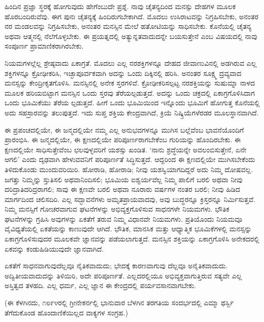 ಹಿಂದಿನ ಪ್ರಜ್ಞಾ ಸ್ಥರಕ್ಕೆ ಹೋಗುವುದು ಹೇಗೆಂಬುದೇ ಪ್ರಶ್ನೆ. ನಾವು ಚೈತನ್ಯದಿಂದ ಮನಸ್ಸು ದೇಹಗಳ ಮೂಲಕ ಹೊರಬಂದಿರುವೆವು. ಈಗ ಪುನಃ ಚೈತನ್ಯಕ್ಕೆ ಹಿಂದಿರುಗಬೇಕಾಗಿದೆ. ಮೊದಲು ಉಸಿರಾಟವನ್ನು ನಿಗ್ರಹಿಸಬೇಕು, ಅನಂತರ ನರ ಮಂಡಲವನ್ನು ನಿಗ್ರಹಿಸಬೇಕು, ಅನಂತರ ಮನಸ್ಸಿನ ಮೇಲೆ ಹತೋಟಿಯನ್ನು ಸಾಧಿಸಬೇಕು. ಕೊನೆಯಲ್ಲಿ ಚೈತನ್ಯ ಅಥವಾ ಆತ್ಮನಲ್ಲಿ ನೆಲೆಗೊಳ್ಳಬೇಕು. ಈ ಪ್ರಯತ್ನದಲ್ಲಿ ಅತ್ಯುನ್ನತವಾದುದನ್ನೇ ಬಯಸುತ್ತೇನೆ ಎಂಬ ವಿಷಯದಲ್ಲಿ ನಾವು ಸಂಪೂರ್ಣ ಪ್ರಾಮಾಣಿಕರಾಗಿರಬೇಕು.

ನಿಯಮಗಳಲ್ಲೆಲ್ಲ ಶ್ರೇಷ್ಠವಾದು ಏಕಾಗ್ರತೆ. ಮೊದಲು ಎಲ್ಲ ನರಶಕ್ತಿಗಳನ್ನೂ ದೇಹದ ಜೀವಾಣುವಿನಲ್ಲಿ ಅಡಗಿರುವ ಎಲ್ಲ ಶಕ್ತಿಗಳನ್ನೂ ಕ್ರೋಢೀಕರಿಸಿ, ಇಚ್ಛಾಪೂರ್ವಕವಾಗಿ ಅದನ್ನು ಒಂದು ದಿಕ್ಕಿನಲ್ಲಿ ಹರಿಸಿ. ಅನಂತರ ಸೂಕ್ಷ್ಮ ದ್ರವ್ಯವಾದ ಮನಸ್ಸನ್ನು ಕೇಂದ್ರೀಕೃತಗೊಳಿಸಿ. ಮನಸ್ಸಿನಲ್ಲಿ ಅನೇಕ ಸ್ತರಗಳಿವೆ. ಕ್ರೋಢೀಕರಿಸಲ್ಪಟ್ಟ ನರಶಕ್ತಿಯನ್ನು ಸುಷುಮ್ನಾ ನಾಳದ ಮೂಲಕ ಹರಿಯಬಿಟ್ಟಾಗ ಮನಸ್ಸಿನ ಒಂದು ಸ್ತರವು ತೆರೆಯಲ್ಪಡುತ್ತದೆ. ಅದನ್ನು ಒಂದು ಚಕ್ರದಲ್ಲಿ ಏಕಾಗ್ರಗೊಳಿಸಿದಾಗ ಒಂದು ಭೂಮಿಕೆಯು ತೆರೆಯ ಲ್ಪಡುತ್ತದೆ. ಹೀಗೆ ಒಂದು ಭೂಮಿಯಿಂದ ಇನ್ನೊಂದು ಭೂಮಿಗೆ ಹೋಗುತ್ತ ಕೊನೆಯಲ್ಲಿ ಅದು ಸಹಸ್ರಾರವನ್ನು ತಲುಪುತ್ತದೆ. ಇದು ಸುಪ್ತ ಶಕ್ತಿಯ ಕೇಂದ್ರವಾಗಿದೆ, ಕ್ರಿಯೆ ನಿಷ್ಕ್ರಿಯೆಗಳೆರಡರ ಮೂಲಸ್ಥಾನವಾಗಿದೆ.

ಈ ಪ್ರಪಂಚದಲ್ಲಿಯೇ, ಈ ಜನ್ಮದಲ್ಲಿಯೇ ನಮ್ಮ ಎಲ್ಲ ಅನುಭವಗಳನ್ನೂ ಮುಗಿಸ ಬಲ್ಲೆವೆಂಬ ಭಾವನೆಯೊಂದಿಗೆ ಪ್ರಾರಂಭಿಸಿ. ಈ ಜನ್ಮದಲ್ಲಿಯೇ, ಈ ಕ್ಷಣದಲ್ಲಿಯೇ ಪರಿಪೂರ್ಣರಾಗಬೇಕೆಂಬ ಗುರಿಯನ್ನು ಹೊಂದಿರಬೇಕು. ಈ ಕ್ಷಣದಲ್ಲಿಯೇ ಸಾಧಿಸುತ್ತೇವೆಂಬ ಛಲವುಳ್ಳವರಿಗೆ ಯಶಸ್ಸು ಖಂಡಿತ. ‘ನಾನು ಶ್ರದ್ಧೆಯನ್ನೇ ಅವಲಂಬಿಸುತ್ತೇನೆ, ಏನೇ ಆಗಲಿ’ ಎಂದು ದೃಢವಾಗಿ ಹೇಳುವವನಿಗೆ ಪರಿಪೂರ್ಣತೆ ಸಿದ್ಧಿಸುತ್ತದೆ. ಆದ್ದರಿಂದ ಈ ಕ್ಷಣದಲ್ಲಿಯೇ ಮುಗಿಸಬೇಕೆಂದು ತಿಳಿದುಕೊಂಡು ಮುಂದುವರಿಯಿರಿ. ಹೋರಾಡಿ, ಹೋರಾಡಿ; ನೀವು ಯಶಸ್ವಿಯಾಗದಿದ್ದರೆ ಅದು ನಿಮ್ಮ ದೋಷವಲ್ಲ. ಜಗತ್ತು ನಿಮ್ಮನ್ನು ಸ್ತುತಿಸಲಿ ಅಥವಾನಿಂದಿಸಲಿ; ಭೂಮಿಯ ಐಶ್ವರ್ಯವೆಲ್ಲ ನಿಮ್ಮ ಪಾಲಿಗೆ ಬರಲಿ ಅಥವಾ ನೀವು ದರಿದ್ರಾತಿದರಿದ್ರರಾಗಲಿ; ಸಾವು ಈ ಕ್ಷಣವೇ ಬರಲಿ ಅಥವಾ ನೂರಾರು ವರ್ಷಗಳ ನಂತರ ಬರಲಿ; ನೀವು ಹಿಡಿದ ಮಾರ್ಗದಿಂದ ಚಲಿಸದಿರಿ. ಎಲ್ಲ ಸದ್ಭಾವನೆಗಳು ಅಮೃತಪ್ರಾಯವಾದವು, ಅವು ಬುದ್ಧರನ್ನೂ ಕ್ರಿಸ್ತರನ್ನೂ ನಿರ್ಮಿಸುತ್ತವೆ. ನಿಮ್ಮ ಮನಸ್ಸಿಗೆ ಗೋಚರವಾಗುವ ಘಟನೆಗಳನ್ನು ಅಭಿವ್ಯಕ್ತಗೊಳಿಸುವ ಸಾಧನಗಳೇ ನಿಯಮಗಳು. ಭೌತಿಕ ಘಟನೆಗಳನ್ನು ಗ್ರಹಿಸಿ ಅವುಗಳನ್ನು ಏಕತೆಗೆ ತರುವ ನಿಮ್ಮ ವಿಧಾನವೇ ನಿಯಮಗಳು. ಪ್ರತಿಯೊಂದು ನಿಯಮವೂ ವೈವಿಧ್ಯತೆಯಲ್ಲಿ ಏಕತೆಯನ್ನು ಕಾಣುವುದೇ ಆಗಿದೆ. ಭೌತಿಕ, ಮಾನಸಿಕ ಮತ್ತು ಆಧ್ಯಾತ್ಮಿಕ ಭೂಮಿಕೆಗಳಲ್ಲಿ ಮನಸ್ಸನ್ನು ಏಕಾಗ್ರಗೊಳಿಸುವುದರ ಮೂಲಕವೇ ಜ್ಞಾನವನ್ನು ಪಡೆಯಲಾಗುತ್ತದೆ. ಮನಸ್ಸಿನ ಶಕ್ತಿಯನ್ನು ಏಕಾಗ್ರಗೊಳಿಸಿ ಅನೇಕದರಲ್ಲಿ ಏಕವನ್ನು ಕಂಡುಹಿಡಿಯುವುದೇ ಜ್ಞಾನವಾಗಿದೆ.

ಏಕತೆಗೆ ಸಾಧನವಾಗುವುದೆಲ್ಲವೂ ನೈತಿಕವಾದುದು; ಭೇದಕ್ಕೆ ಕಾರಣವಾಗುವು ದೆಲ್ಲವೂ ಅನೈತಿಕವಾದುದು. ಅದ್ವಿತೀಯವಾದುದನ್ನು ತಿಳಿಯಿರಿ, ಅದೇ ಪರಿಪೂರ್ಣತೆ. ಎಲ್ಲದರಲ್ಲಿಯೂ ಅಭಿವ್ಯಕ್ತವಾಗುತ್ತಿರುವ ಸತ್ಯವೇ ಎಲ್ಲ ಅಸ್ತಿತ್ವದ ತಳಹದಿ. ಎಲ್ಲ ಧರ್ಮ, ಎಲ್ಲ ಜ್ಞಾನ ಈ ಕೇಂದ್ರದಲ್ಲಿ ಪರ್ಯವಸಾನವಾಗಬೇಕು.

(ಈ ಕೆಳಗಿನದು, ೧೮೯೪ರಲ್ಲಿ ಗ್ರೀನೇಕರ್ನಲ್ಲಿ ಭಾನುವಾರ ಬೆಳಗಿನ ತರಗತಿಯ ಸಂದರ್ಭದಲ್ಲಿ ಎಮ್ಮಾ ಥರ್ಸ್ಬಿ ತೆಗೆದುಕೊಂಡ ಹೊಂದಾಣಿಕೆಯಿಲ್ಲದ ವಾಕ್ಯಗಳ ಸಂಗ್ರಹ.)

